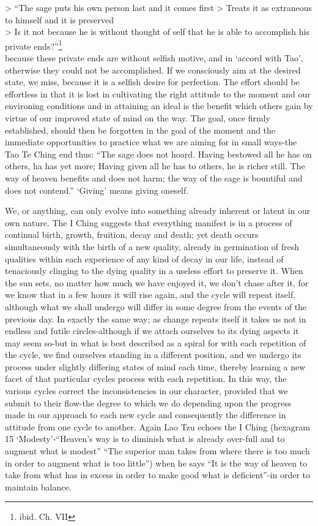 \documentclass[11pt]{book}
\begin{document}
\textgreater{} ``The sage puts his own person last and it comes first \textgreater{} Treats it as extraneous to himself and it is preserved\\
\textgreater{} Is it not because he is without thought of self that he is able to accomplish his private ends?''\footnote{ibid. Ch. VII}\\
because these private ends are without selfish motive, and in `accord with Tao', otherwise they could not be accomplished. If we consciously aim at the desired state, we miss, because it is a selfish desire for perfection. The effort should be effortless in that it is lost in cultivating the right attitude to the moment and our environing conditions and in attaining an ideal is the benefit which others gain by virtue of our improved state of mind on the way. The goal, once firmly established, should then be forgotten in the goal of the moment and the immediate opportunities to practice what we are aiming for in small ways-the Tao Te Ching end thus: ``The sage does not hoard. Having bestowed all he has on others, ha has yet more; Having given all he has to others, he is richer still. The way of heaven benefits and does not harm; the way of the sage is bountiful and does not contend.'' `Giving' means giving oneself.

We, or anything, can only evolve into something already inherent or latent in our own nature. The I Ching suggests that everything manifest is in a process of continual birth, growth, fruition, decay and death; yet death occurs simultaneously with the birth of a new quality, already in germination of fresh qualities within each experience of any kind of decay in our life, instead of tenaciously clinging to the dying quality in a useless effort to preserve it. When the sun sets, no matter how much we have enjoyed it, we don't chase after it, for we know that in a few hours it will rise again, and the cycle will repeat itself, although what we shall undergo will differ in some degree from the events of the previous day. In exactly the same way; as change repeats itself it takes us not in endless and futile circles-although if we attach ourselves to its dying aspects it may seem so-but in what is best described as a spiral for with each repetition of the cycle, we find ourselves standing in a different position, and we undergo its process under slightly differing states of mind each time, thereby learning a new facet of that particular cycles process with each repetition. In this way, the various cycles correct the inconsistencies in our character, provided that we submit to their flow-the degree to which we do depending upon the progress made in our approach to each new cycle and consequently the difference in attitude from one cycle to another. Again Lao Tzu echoes the I Ching (hexagram 15 `Modesty'-``Heaven's way is to diminish what is already over-full and to augment what is modest'' ``The superior man takes from where there is too much in order to augment what is too little'') when he says ``It is the way of heaven to take from what has in excess in order to make good what is deficient''-in order to maintain balance.
\end{document}
